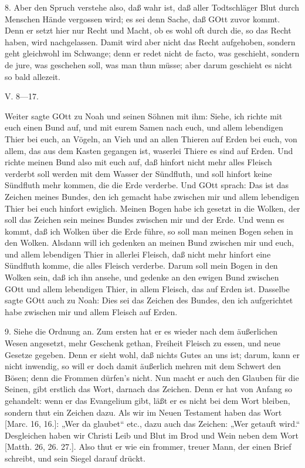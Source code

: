 8. Aber den Spruch verstehe also, daß wahr ist, daß aller Todtschläger Blut durch Menschen Hände vergossen wird; es sei denn Sache, daß GOtt zuvor kommt. Denn er setzt hier nur Recht und Macht, ob es wohl oft durch die, so das Recht haben, wird nachgelassen. Damit wird aber nicht das Recht aufgehoben, sondern geht gleichwohl im Schwange; denn er redet nicht de facto, was geschieht, sondern de jure, was geschehen soll, was man thun müsse; aber darum geschieht es nicht so bald allezeit.

\begin{schriftzitat}
V. 8—17.

Weiter sagte GOtt zu Noah und seinen Söhnen mit ihm: Siehe, ich richte mit euch einen Bund auf, und mit eurem Samen nach euch, und allem lebendigen Thier bei euch, an Vögeln, an Vieh und an allen Thieren auf Erden bei euch, von allem, das aus dem Kasten gegangen ist, waserlei Thiere es sind auf Erden. Und richte meinen Bund also mit euch auf, daß hinfort nicht mehr alles Fleisch verderbt soll werden mit dem Wasser der Sündfluth, und soll hinfort keine Sündfluth mehr kommen, die die Erde verderbe. Und GOtt sprach: Das ist das Zeichen meines Bundes, den ich gemacht habe zwischen mir und allem lebendigen Thier bei euch hinfort ewiglich. Meinen Bogen habe ich gesetzt in die Wolken, der soll das Zeichen sein meines Bundes zwischen mir und der Erde. Und wenn es kommt, daß ich Wolken über die Erde führe, so soll man meinen Bogen sehen in den Wolken. Alsdann will ich gedenken an meinen Bund zwischen mir und euch, und allem lebendigen Thier in allerlei Fleisch, daß nicht mehr hinfort eine Sündfluth komme, die alles Fleisch verderbe. Darum soll mein Bogen in den Wolken sein, daß ich ihn ansehe, und gedenke an den ewigen Bund zwischen GOtt und allem lebendigen Thier, in allem Fleisch, das auf Erden ist. Dasselbe sagte GOtt auch zu Noah: Dies sei das Zeichen des Bundes, den ich aufgerichtet habe zwischen mir und allem Fleisch auf Erden.
\end{schriftzitat}

9. Siehe die Ordnung an. Zum ersten hat er es wieder nach dem äußerlichen Wesen angesetzt, mehr Geschenk gethan, Freiheit Fleisch zu essen, und neue Gesetze gegeben. Denn er sieht wohl, daß nichts Gutes an uns ist; darum, kann er nicht inwendig, so will er doch damit äußerlich mehren mit dem Schwert den Bösen; denn die Frommen dürfen’s nicht. Nun macht er auch den Glauben für die Seinen, gibt erstlich das Wort, darnach das Zeichen. Denn er hat von Anfang so gehandelt: wenn er das Evangelium gibt, läßt er es nicht bei dem Wort bleiben, sondern thut ein Zeichen dazu. Als wir im Neuen Testament haben das Wort [Marc. 16, 16.]: „Wer da glaubet“ etc., dazu auch das Zeichen: „Wer getauft wird.“ Desgleichen haben wir Christi Leib und Blut im Brod und Wein neben dem Wort [Matth. 26, 26. 27.]. Also thut er wie ein frommer, treuer Mann, der einen Brief schreibt, und sein Siegel darauf drückt.

